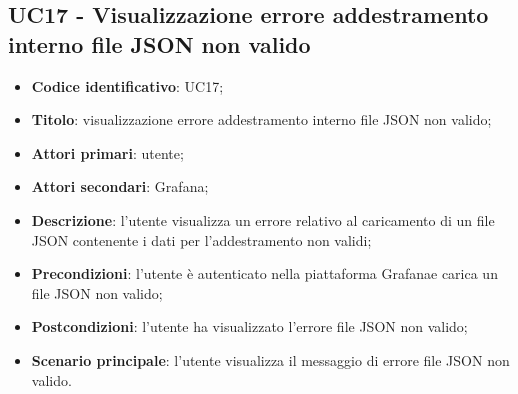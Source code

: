 \subsection{UC17 - Visualizzazione errore addestramento interno file JSON non valido}
\begin{itemize}
	\item \textbf{Codice identificativo}: UC17;
	\item \textbf{Titolo}: visualizzazione errore addestramento interno file JSON non valido;
	\item \textbf{Attori primari}: utente;
	\item \textbf{Attori secondari}: Grafana\glo;
	\item \textbf{Descrizione}: l'utente visualizza un errore relativo al caricamento di un file JSON contenente i dati per l'addestramento non validi;
	\item \textbf{Precondizioni}: l'utente è autenticato nella piattaforma Grafana\glosp e carica un file JSON non valido;
	\item \textbf{Postcondizioni}: l'utente ha visualizzato l'errore file JSON non valido;	
	\item \textbf{Scenario principale}: l'utente visualizza il messaggio di errore file JSON non valido.	
\end{itemize}
